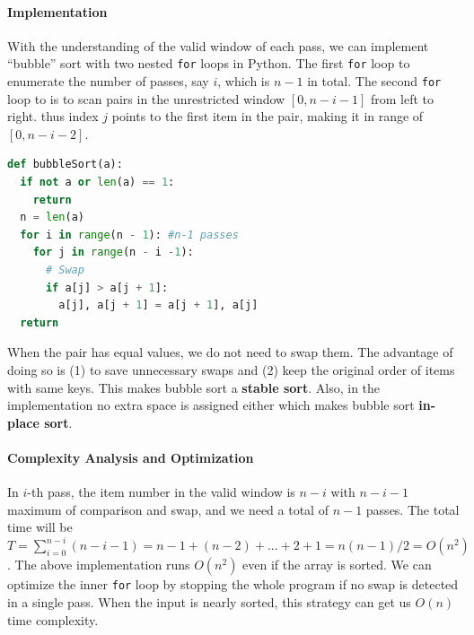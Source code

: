 \documentclass[../main.tex]{subfiles}
\begin{document}
\paragraph{Implementation} With the understanding of the valid window of each pass, we can implement ``bubble'' sort with two nested \texttt{for} loops in Python. The first \texttt{for} loop to enumerate the number of passes, say $i$, which is  $n-1$ in total. The second \texttt{for} loop to is to scan pairs in the unrestricted window $[0, n-i-1]$ from left to right. thus index $j$ points to the first item in the pair, making it in range of $[0, n-i-2]$.
\begin{lstlisting}[language = Python]
def bubbleSort(a):
  if not a or len(a) == 1:
    return 
  n = len(a)
  for i in range(n - 1): #n-1 passes 
    for j in range(n - i -1): 
      # Swap
      if a[j] > a[j + 1]:
        a[j], a[j + 1] = a[j + 1], a[j] 
  return
\end{lstlisting}
When the pair has equal values, we do not need to swap them. The advantage of doing so is (1) to save unnecessary swaps and (2) keep the original order of items with same keys. This makes bubble sort a \textbf{stable sort}.  Also, in the implementation no extra space is assigned either which makes bubble sort \textbf{in-place sort}.




\paragraph{Complexity Analysis and Optimization} In $i$-th pass, the item number in the valid window is $n-i$ with $n-i-1$ maximum of comparison and swap, and we need a total of $n-1$ passes. The total time will be $T = \sum_{i=0}^{n-i}{(n-i-1)} = n-1 + (n-2) +...+2+1 = n(n-1)/2=O(n^2)$. The above implementation runs $O(n^2)$ even if the array is sorted. We can optimize the inner \texttt{for} loop by stopping the whole program if no swap is detected in a single pass. When the input is nearly sorted, this strategy can get us $O(n)$ time complexity.
\end{document}
